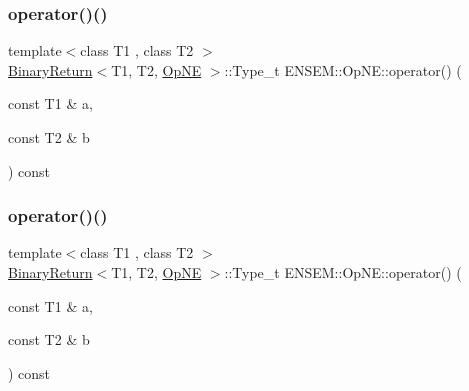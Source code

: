 \subsubsection{\texorpdfstring{operator()()}{operator()()}\hspace{0.1cm}{\footnotesize\ttfamily [1/3]}}
{\footnotesize\ttfamily template$<$class T1 , class T2 $>$ \\
\mbox{\hyperlink{structENSEM_1_1BinaryReturn}{Binary\+Return}}$<$T1, T2, \mbox{\hyperlink{structENSEM_1_1OpNE}{Op\+NE}} $>$\+::Type\+\_\+t E\+N\+S\+E\+M\+::\+Op\+N\+E\+::operator() (\begin{DoxyParamCaption}\item[{const T1 \&}]{a,  }\item[{const T2 \&}]{b }\end{DoxyParamCaption}) const\hspace{0.3cm}{\ttfamily [inline]}}

\mbox{\label{structENSEM_1_1OpNE_a7591dc1f0aa2c67130ef3ec7a406f54e}} 
\subsubsection{\texorpdfstring{operator()()}{operator()()}\hspace{0.1cm}{\footnotesize\ttfamily [2/3]}}
{\footnotesize\ttfamily template$<$class T1 , class T2 $>$ \\
\mbox{\hyperlink{structENSEM_1_1BinaryReturn}{Binary\+Return}}$<$T1, T2, \mbox{\hyperlink{structENSEM_1_1OpNE}{Op\+NE}} $>$\+::Type\+\_\+t E\+N\+S\+E\+M\+::\+Op\+N\+E\+::operator() (\begin{DoxyParamCaption}\item[{const T1 \&}]{a,  }\item[{const T2 \&}]{b }\end{DoxyParamCaption}) const\hspace{0.3cm}{\ttfamily [inline]}}

\mbox{\label{structENSEM_1_1OpNE_a7591dc1f0aa2c67130ef3ec7a406f54e}} 
